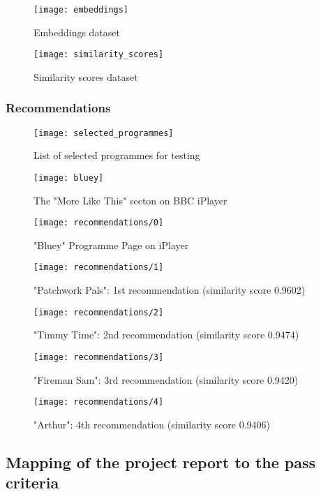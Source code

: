 \begin{figure}[h]
  \centering
  \texttt{[image: embeddings]}
  \caption{Embeddings dataset}
  \label{fig:embeddings}
\end{figure}

\begin{figure}[h]
  \centering
  \texttt{[image: similarity\_scores]}
  \caption{Similarity scores dataset}
  \label{fig:similarity_scores}
\end{figure}

\subsubsection{Recommendations}

\begin{figure}[h]
  \centering
  \texttt{[image: selected\_programmes]}
  \caption{List of selected programmes for testing}
  \label{fig:selected_programmes}
\end{figure}

\begin{figure}[h]
  \centering
  \texttt{[image: bluey]}
  \caption{The "More Like This" secton on BBC iPlayer}
  \label{fig:bluey}
\end{figure}

\begin{figure}[h]
  \centering
  \texttt{[image: recommendations/0]}
  \caption{"Bluey" Programme Page on iPlayer}
  \label{fig:recommendations:0}
\end{figure}

\begin{figure}[h]
  \centering
  \texttt{[image: recommendations/1]}
  \caption{"Patchwork Pals": 1st recommendation (similarity score 0.9602)}
  \label{fig:recommendations:1}
\end{figure}

\begin{figure}[h]
  \centering
  \texttt{[image: recommendations/2]}
  \caption{"Timmy Time": 2nd recommendation (similarity score 0.9474)}
  \label{fig:recommendations:1}
\end{figure}

\begin{figure}[h]
  \centering
  \texttt{[image: recommendations/3]}
  \caption{"Fireman Sam": 3rd recommendation (similarity score 0.9420)}
  \label{fig:recommendations:1}
\end{figure}

\begin{figure}[h]
  \centering
  \texttt{[image: recommendations/4]}
  \caption{"Arthur": 4th recommendation (similarity score 0.9406)}
  \label{fig:recommendations:1}
\end{figure}

\subsection{Mapping of the project report to the pass criteria}
